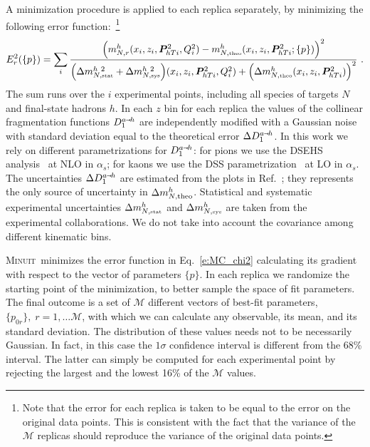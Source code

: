 \documentclass[aps,preprintnumbers,showpacs,nofootinbib,superscriptaddress,floatfix]{revtex4}
\newcommand{\smarrow}{\mbox{\raisebox{-4.5pt}[0pt][0pt]{$\hspace{-1pt} 
		\vec{\phantom{v}}$}}}
\newcommand{\minuit}{\textsc{Minuit}}
\newcommand{\Tperp}{T}
\begin{document}
A minimization procedure is applied to each replica separately, by minimizing the following error function:~\footnote{Note that the error for each replica is taken to be equal to the error on the original data points. This is consistent with the fact that the variance of the $\mathcal{M}$ replicas should reproduce the variance of the original data points.}  
\begin{equation}
E_r^2(\{p\})=\sum_{i} 
\frac{\Bigl(m_{N, r}^{h}(x_i, z_i, \bm{P}_{h\Tperp i}^2, Q_i^2) - m_{N,  \mbox{\tiny theo}}^{h}(x_i, z_i, \bm{P}_{h\Tperp i}^2; \{p\})\Bigr)^2}
        {\Bigl( \Delta m_{N, \mbox{\tiny stat}}^{h\ 2} + \Delta m_{N, \mbox{\tiny sys}}^{h\ 2} \Bigr)(x_i, z_i, \bm{P}_{h\Tperp i}^2, Q^2_i) +\Bigl(\Delta m_{N, \mbox{\tiny theo}}^{h}(x_i, z_i, \bm{P}_{h\Tperp i}^2) \Bigr)^2}\  . 
\label{e:MC_chi2}
\end{equation}
The sum runs over the $i$ experimental points, including all species of targets $N$ and final-state hadrons $h$. 
In each $z$ bin for each replica the values of the collinear fragmentation functions $D_1^{a \smarrow h}$ are independently modified with a Gaussian noise with standard deviation equal to the theoretical error $\Delta D_1^{a\smarrow h}$. 
In this work we rely on different parametrizations for $D_1^{a \smarrow h}$: for pions we use the DSEHS analysis~\cite{deFlorian:2014xna} at NLO in $\alpha_s$; for kaons we use the DSS parametrization~\cite{deFlorian:2007aj} at LO in $\alpha_s$. 
The uncertainties $\Delta D_1^{a\smarrow h}$ are estimated from the plots in Ref.~\cite{Epele:2012vg}; they represents the only source of uncertainty in $\Delta m_{N,  {\rm theo}}^{h}$. 
Statistical and systematic experimental uncertainties $\Delta m_{N, \mbox{\tiny stat}}^{h}$ and $\Delta m_{N, \mbox{\tiny sys}}^{h}$ are taken from the experimental collaborations. 
We do not take into account the covariance among different kinematic bins. 

\minuit\ minimizes the error function in Eq.~\eqref{e:MC_chi2} calculating its gradient with respect to the vector of parameters $\{p\}$. 
In each replica we randomize the starting point of the minimization, to better
sample the space of fit parameters.
 The final outcome is a set of $\mathcal{M}$ different vectors of best-fit parameters, $\{ p_{0r}\},\; r=1,\ldots \mathcal{M}$, with which we can calculate any observable, its mean, and its standard deviation. 
The distribution of these values needs not to be necessarily Gaussian. In fact, in this case the $1 \sigma$ confidence interval is different from the 68\% interval. 
The latter can simply be computed for each experimental point by rejecting the largest and the lowest 16\% of the $\mathcal{M}$ values.   
\end{document}
